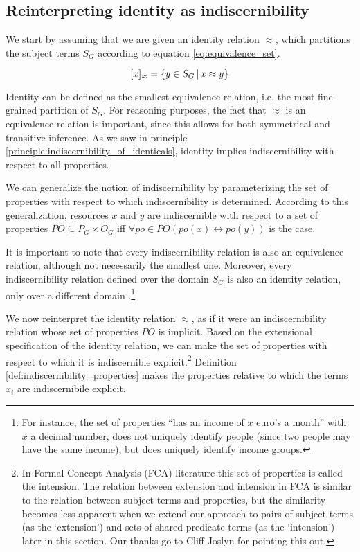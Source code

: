 \subsection{Reinterpreting identity as indiscernibility}

We start by assuming that we are given an identity relation $\approx$,
  which partitions the subject terms $S_G$ according to
  \mbox{equation} \ref{eq:equivalence_set}.

\begin{equation}
\label{eq:equivalence_set}
  [x]_{\approx}
=
  \{
    y \in S_G
  \,\vert\,
    x \approx y
  \}
\end{equation}

Identity can be defined as the smallest equivalence relation,
  i.e. the most fine-grained partition of $S_G$.
For reasoning purposes, the fact that $\approx$ is an equivalence relation
  is important, since this allows for both symmetrical
  and transitive inference.
As we saw in principle \ref{principle:indiscernibility_of_identicals},
  identity implies indiscernibility with respect to all properties.

We can generalize the notion of indiscernibility
  by parameterizing the set of properties with respect to which
  indiscernibility is determined.
According to this generalization,
  resources $x$ and $y$ are indiscernible with respect to
  a set of properties $PO \subseteq P_G \times O_G$
  iff $\forall po \in PO (po(x) \leftrightarrow po(y))$ is the case.

It is important to note that every indiscernibility relation
  is also an equivalence relation, although not necessarily the smallest one.
Moreover, every indiscernibility relation defined over the domain $S_G$
  is also an identity relation,
  only over a different domain \cite{Quine1950}.\footnote{
    For instance, the set of properties
      ``has an income of $x$ euro's a month''
      with $x$ a decimal number, does not uniquely identify people
      (since two people may have the same income),
      but does uniquely identify income groups.
    }

We now reinterpret the identity relation $\approx$,
  as if it were an indiscernibility relation
  whose set of properties $PO$ is implicit.
Based on the extensional specification of the identity relation,
  we can make the set of properties with respect to which
  it is indiscernible explicit.\footnote{
    In Formal Concept Analysis (FCA) literature this set of properties
    is called the intension. The relation between extension and intension
    in FCA is similar to the relation between subject terms and properties,
    but the similarity becomes less apparent when we extend our approach
    to pairs of subject terms (as the `extension') and sets of
    shared predicate terms (as the `intension') later in this section.
    Our thanks go to Cliff Joslyn for pointing this out.
  }
Definition \ref{def:indiscernibility_properties} makes
  the properties relative to which the terms $x_i$ are indiscernibile
  explicit.

